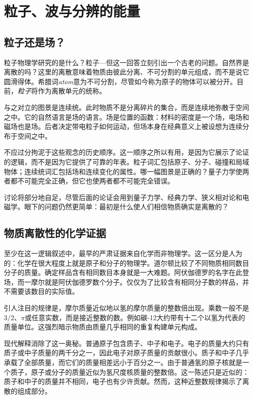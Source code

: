 \chapter{粒子、波与分辨的能量}

\section{粒子还是场？}

粒子物理学研究的是什么？粒子---但这一回答立刻引出一个古老的问题。自然界是离散的吗？这里的离散意味着物质由彼此分离、不可分割的单元组成，而不是说它圆滑得体。希腊词\emph{atom}意为不可分割，尽管如今称为原子的物体可以被分开。目前，\emph{粒子}将作为离散单元的统称。

与之对立的图景是连续统。此时物质不是分离碎片的集合，而是连续地弥散于空间之中。它的自然语言是场的语言。场是位置的函数：材料的密度是一个场，电场和磁场也是场。后者决定带电粒子如何运动，但场本身在经典意义上被设想为连续分布于空间之中。

不应过分拘泥于这些观念的历史顺序。这一顺序之所以有用，是因为它展示了论证的逻辑，而不是因为它提供了可靠的年表。粒子词汇包括原子、分子、碰撞和局域物体；连续统词汇包括场和连续变化的属性。哪一幅图景是正确的？量子力学使两者都不可能完全正确，但它也使两者都不可能完全错误。

讨论将部分地自足，尽管后面的论证会用到量子力学、经典力学、狭义相对论和电磁学。眼下的问题仍然更简单：最初是什么使人们相信物质确实是离散的？

\section{物质离散性的化学证据}

至少在这一逻辑叙述中，最早的严肃证据来自化学而非物理学。这一区分是人为的：化学在很大程度上就是原子和分子的物理学。道尔顿比较了不同物质相同数目分子的质量。确定样品含有相同数目本身就是一大难题。阿伏伽德罗的名字在此登场，而一摩尔就是阿伏伽德罗数个分子。仅仅为了比较含有相同分子数的样品，并不需要该数目的实际值。

引人注目的规律是，摩尔质量近似地以氢的摩尔质量的整数倍出现。乘数一般不是\(3/2\)、\(\pi\)或任意实数，而是接近整数的数。例如碳-12大约带有十二个以氢为代表的质量单位。这强烈暗示物质由质量几乎相同的重复构建单元构成。

现代解释消除了这一奥秘。普通原子包含质子、中子和电子。电子的质量大约只有质子或中子质量的两千分之一，因此电子对原子质量的贡献很小。质子和中子几乎承载了全部质量，而它们的质量相差远小于百分之一。由于普通氢的原子核就是一个质子，原子或分子的质量近似为氢尺度核质量的整数倍。这一陈述只是近似的：质子和中子的质量并不相同，电子也有少许贡献。然而，这种近整数规律揭示了离散的组成部分。

